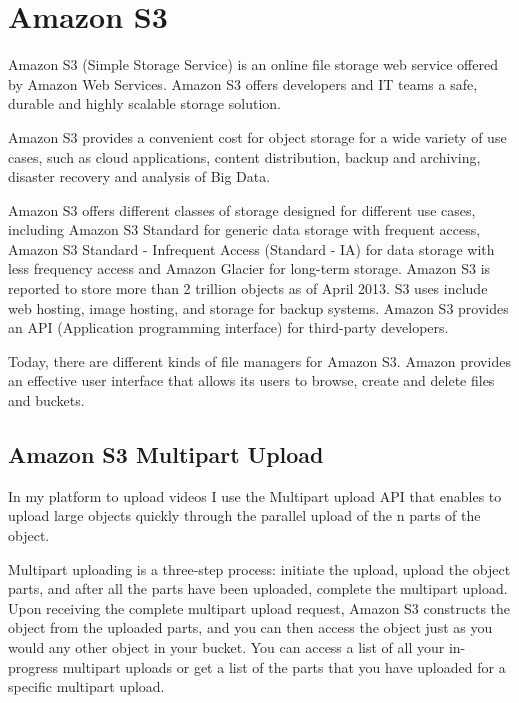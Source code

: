 \section{Amazon S3}
\label{sec:Amazon S3}

Amazon S3 (Simple Storage Service) is an online file storage web service offered by Amazon Web Services. Amazon S3 offers developers and IT teams a safe, durable and highly scalable storage solution.

Amazon S3 provides a convenient cost for object storage for a wide variety of use cases, such as cloud applications, content distribution, backup and archiving, disaster recovery and analysis of Big Data.

Amazon S3 offers different classes of storage designed for different use cases, including Amazon S3 Standard for generic data storage with frequent access, Amazon S3 Standard - Infrequent Access (Standard - IA) for data storage with less frequency access and Amazon Glacier for long-term storage.
Amazon S3 is reported to store more than 2 trillion objects as of April 2013.\cite{s3_stats} S3 uses include web hosting, image hosting, and storage for backup systems. 
Amazon S3 provides an API (Application programming interface) for third-party developers.

Today, there are different kinds of file managers for Amazon S3. 
Amazon provides an effective user interface that allows its users to browse, create and delete files and buckets.

\subsection{Amazon S3 Multipart Upload}
\label{subsec:amazon_S3_multipart_upload_initiation}


In my platform to upload videos I use the Multipart upload API that enables to upload large objects quickly through the parallel upload of the n parts of the object.

Multipart uploading is a three-step process: initiate the upload, upload the object parts, and after all the parts have been uploaded, complete the multipart upload. Upon receiving the complete multipart upload request, Amazon S3 constructs the object from the uploaded parts, and you can then access the object just as you would any other object in your bucket.
You can access a list of all your in-progress multipart uploads or get a list of the parts that you have uploaded for a specific multipart upload.\cite{s3_multipart}


